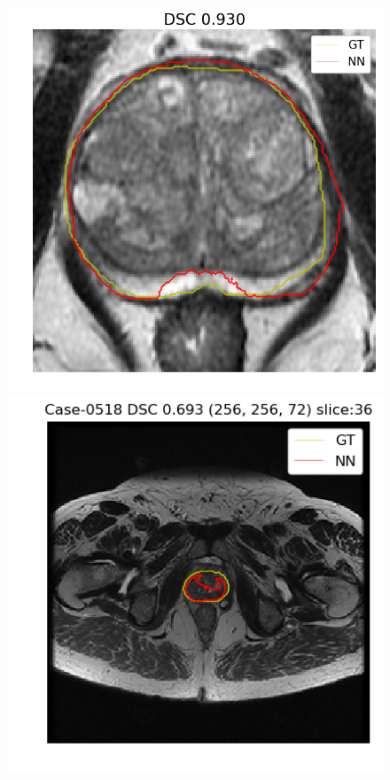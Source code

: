 \begin{figure}[h]
    \includegraphics[totalheight=.2\textheight]{figures/results/Prostate_GE__GE_yes_ROI_MAX_Case-0537.png}
    \vspace{10mm}
    \includegraphics[totalheight=.2\textheight]{figures/results/Prostate_GE__GE_yes_Original_MIN_Case-0518.png}

\end{figure}
